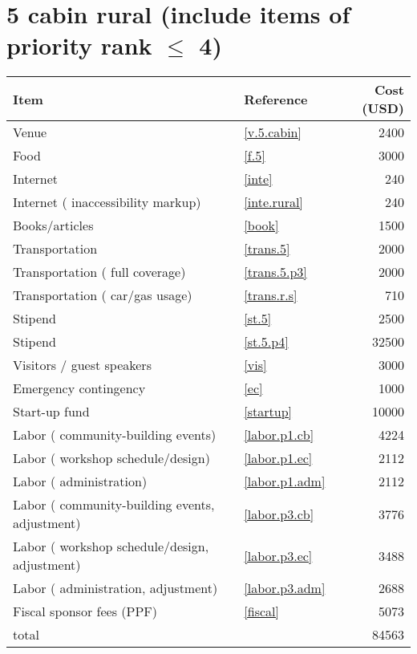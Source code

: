 \section*{5 cabin rural (include items of priority rank $\leq$ 4)}
\begin{center}
\begin{tabular}{llr}
Item & Reference & Cost (USD) \\ \hline
Venue & \ref{v.5.cabin} & 2400 \\
Food & \ref{f.5} & 3000 \\
Internet & \ref{inte} & 240 \\
Internet ( inaccessibility markup) & \ref{inte.rural} & 240 \\
Books/articles & \ref{book} & 1500 \\
Transportation & \ref{trans.5} & 2000 \\
Transportation ( full coverage) & \ref{trans.5.p3} & 2000 \\
Transportation ( car/gas usage) & \ref{trans.r.s} & 710 \\
Stipend & \ref{st.5} & 2500 \\
Stipend & \ref{st.5.p4} & 32500 \\
Visitors / guest speakers & \ref{vis} & 3000 \\
Emergency contingency & \ref{ec} & 1000 \\
Start-up fund & \ref{startup} & 10000 \\
Labor ( community-building events) & \ref{labor.p1.cb} & 4224 \\
Labor ( workshop schedule/design) & \ref{labor.p1.ec} & 2112 \\
Labor ( administration) & \ref{labor.p1.adm} & 2112 \\
Labor ( community-building events, adjustment) & \ref{labor.p3.cb} & 3776 \\
Labor ( workshop schedule/design, adjustment) & \ref{labor.p3.ec} & 3488 \\
Labor ( administration, adjustment) & \ref{labor.p3.adm} & 2688 \\
Fiscal sponsor fees (PPF) & \ref{fiscal} & 5073 \\ \hline
total &  & 84563
\end{tabular}
\end{center}
\newpage
